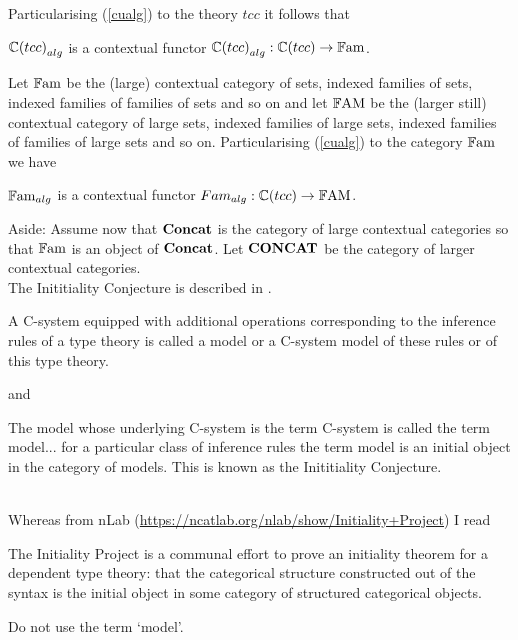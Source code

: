 \note Particularising (\ref{cualg}) to the theory $tcc$ it follows that
\begin{pointeq}
  $\alg{\ccat[C](tcc)}$ is a contextual functor   $\alg{\ccat[C](tcc)} :\ccat[C](tcc) \morph \Fam$.
\end{pointeq}

\note
Let $\Fam$ be the (large) contextual category of sets, indexed families of sets, indexed families of families of sets and so on and
let $\FAM$ be the (larger still) contextual category of large sets, indexed families of large sets, indexed families of families of large sets and so on.
Particularising (\ref{cualg}) to the category $\Fam$ we have
\begin{pointeq}
  \label{inducedalgebra}
  $\alg{\Fam}$ is a contextual functor   $\alg{Fam} :\ccat[C](tcc) \morph \FAM$. 
\end{pointeq}

\note
Aside: Assume now that $\catofccs$ is the category of large contextual categories so that $\Fam$ is an object of $\catofccs$. 
Let $\catoflargerccs$ be the category of larger contextual categories. \\

\note The Inititiality Conjecture is described in \cite{VoevodskyInitialityConjecture}.
\begin{tightquote}
A C-system equipped with additional
operations corresponding to the inference rules of a type theory is called a
model or a C-system model of these rules or of this type theory.
\end{tightquote}
and
\begin{tightquote}
The model whose underlying
C-system is the term C-system is called the term model... for a particular
class of inference rules the term model is an initial object in the category of models.
This is known as the Inititiality Conjecture.
\end{tightquote} 
\ \\
\note Whereas from nLab (\url{https://ncatlab.org/nlab/show/Initiality+Project}) I read
\begin{tightquote}
The Initiality Project is a communal effort to prove an initiality theorem for a dependent type theory: that the categorical structure constructed out of the syntax is the initial object in some category of structured categorical objects.
\end{tightquote}


\note Do not use the term `model'.

